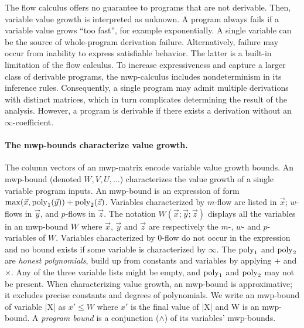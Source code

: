 The flow calculus offers no guarantee to programs that are not derivable.
Then, variable value growth is interpreted as unknown.
A program always fails if a variable value grows \enquote{too fast}, for example exponentially.
A single variable can be the source of whole-program derivation failure.
Alternatively, failure may occur from inability to express satisfiable behavior.
The latter is a built-in limitation of the flow calculus.
To increase expressiveness and capture a larger class of derivable programs,
the mwp-calculus includes nondeterminism in its inference rules.
Consequently, a single program may admit multiple derivations with distinct matrices, which in turn complicates determining the result of the analysis.
However, a program is derivable if there exists a derivation without an \(\infty\)-coefficient.

\paragraph*{The mwp-bounds characterize value growth.}\label{interpreting-bounds}
The column vectors of an mwp-matrix encode variable value growth bounds.
An mwp-bound (denoted \(W,V,U,\ldots\)) characterizes the value growth of a single variable \wrt program inputs.
An mwp-bound is an expression of form $\max(\vec{x}, \operatorname{poly}_1(\vec{y})) + \operatorname{poly}_2(\vec{z})$.
Variables characterized by $m$-flow are listed in $\vec{x}$; $w$-flows in $\vec{y}$, and $p$-flows in $\vec{z}$.
The notation \(W(\vec{x};\vec{y};\vec{z})\) displays all the variables in an mwp-bound $W$ where $\vec{x}$, $\vec{y}$ and $\vec{z}$
are respectively the $m$-, $w$- and $p$-variables of \(W\).
Variables characterized by $0$-flow do not occur in the expression and no bound exists if some variable is characterized by $\infty$.
The $\operatorname{poly}_1$ and $\operatorname{poly}_2$ are \textit{honest polynomials},
build up from constants and variables by applying $+$ and $\times$.
Any of the three variable lists might be empty, and $\operatorname{poly}_1$ and $\operatorname{poly}_2$ may not be present.
When characterizing value growth, an mwp-bound is approximative;
it excludes precise constants and degrees of polynomials.
We write an mwp-bound of variable \pr|X| as \(x' \leq W\) where \(x'\) is the final value of \pr|X| and W is an mwp-bound.
A \emph{program bound} is a conjunction (\(\land\)) of its variables' mwp-bounds.

